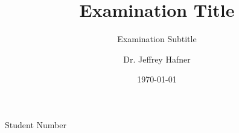 \documentclass[
    11pt,
    titlepage,
]{scrartcl}
\title{Examination Title}
\subtitle{Examination Subtitle \textnumero{}\serialnum}
\author{Dr. Jeffrey Hafner}
\date{\today}
\newlength{\mylen}
\begin{document}










%
%


\begin{examcopy}[2]
    \begin{titlepage}
        \titleAMC
        \newpage
    \end{titlepage}

    \begin{multicols}{2}



    \end{multicols}
    
    \AMCcleardoublepage


    \AMCformBegin

    \setlength{\mylen}{\linewidth}
    \addtolength{\mylen}{-17em}
    \begin{minipage}{\linewidth}
        \centering
        \begin{minipage}{15.5em}
            \centering
            Student Number \\
        \end{minipage}
        \begin{minipage}{\mylen}
            \centering
            \titleHeader \\
        \end{minipage}
    \end{minipage}


\end{examcopy}
\end{document}
